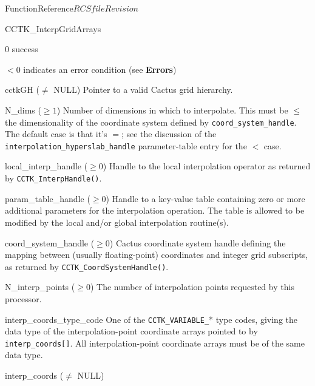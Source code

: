 \begin{cactuspart}{FunctionReference}{$RCSfile$}{$Revision$}
\begin{FunctionDescription}{CCTK\_InterpGridArrays}
\begin{ResultSection}
\begin{Result}{\rm 0} success \end{Result}
\begin{Result}{$< 0$} indicates an error condition (see {\bf Errors}) \end{Result}
\end{ResultSection}

\begin{ParameterSection}
\begin{Parameter}{cctkGH ($\ne$ NULL)}
Pointer to a valid Cactus grid hierarchy.
\end{Parameter}
\begin{Parameter}{N\_dims ($\ge 1$)}
Number of dimensions in which to interpolate.
This must be $\leq$ the dimensionality of the coordinate system defined
by \verb|coord_system_handle|.  The default case is that it's $=$; see
the discussion of the \verb|interpolation_hyperslab_handle| parameter-table
entry for the $<$ case.
\end{Parameter}
\begin{Parameter}{local\_interp\_handle ($\ge 0$)}
Handle to the local interpolation operator as returned by
\verb|CCTK_InterpHandle()|.
\end{Parameter}
\begin{Parameter}{param\_table\_handle ($\ge 0$)}
Handle to a key-value table containing zero or more additional parameters
for the interpolation operation. The table is allowed to be modified by the
local and/or global interpolation routine(s).
\end{Parameter}
\begin{Parameter}{coord\_system\_handle ($\ge 0$)}
Cactus coordinate system handle defining the mapping between
(usually floating-point) coordinates and integer grid subscripts, as returned by
\verb|CCTK_CoordSystemHandle()|.
\end{Parameter}
\begin{Parameter}{N\_interp\_points ($\ge 0$)}
The number of interpolation points requested by this processor.
\end{Parameter}
\begin{Parameter}{interp\_coords\_type\_code}
One of the \verb|CCTK_VARIABLE_|* type codes, giving the data type of the
interpolation-point coordinate arrays pointed to by \verb|interp_coords[]|.
All interpolation-point coordinate arrays must be of the same data type.
\end{Parameter}
\begin{Parameter}{interp\_coords ($\ne$ NULL)}

\end{Parameter}
\end{ParameterSection}
\end{FunctionDescription}
\end{cactuspart}
